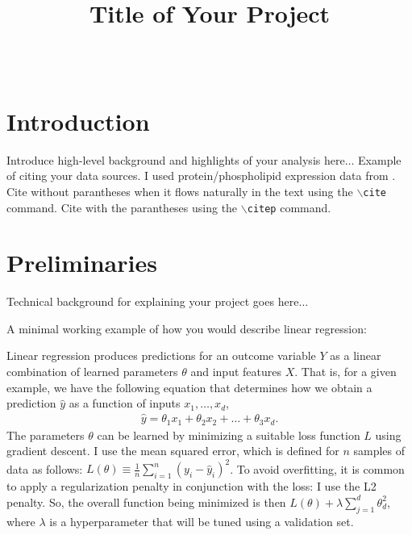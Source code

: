 \documentclass[twoside,11pt]{article}
\begin{document}
\title{Title of Your Project
}

\author{
		 \\
	}


\maketitle

\section{Introduction}
\label{sec:intro}
Introduce high-level background and highlights of your analysis here$\dots$ Example of citing your data sources. I used protein/phospholipid expression data from \cite{sachs2005causal}. Cite without parantheses when it flows naturally in the text using the \texttt{$\backslash$cite} command. Cite with the parantheses using the \texttt{$\backslash$citep} command.


\section{Preliminaries}
\label{sec:prelims}
Technical background for explaining your project goes here$\dots$ 

A minimal working example of how you would describe linear regression:

Linear regression produces predictions for an outcome variable $Y$ as a linear combination of learned parameters $\theta$ and input features $X$. That is, for a given example, we have the following equation that determines how we obtain a prediction $\widehat{y}$ as a function of inputs $x_1, \dots, x_d$,
	\begin{align*}
		\widehat{y} = \theta_1 x_1 + \theta_2 x_2 + \dots + \theta_3 x_d.
	\end{align*}	
	The parameters $\theta$ can be learned by minimizing a suitable loss function $L$ using gradient descent. I  use the mean squared error, which is defined for $n$ samples of data as follows: $L(\theta) \equiv \frac{1}{n} \sum_{i=1}^{n}(y_i - \widehat{y}_i)^2$. To avoid overfitting, it is common to apply a regularization penalty in conjunction with the loss: I use the L2 penalty. So, the overall function being minimized is then $L(\theta) + \lambda \sum_{j=1}^d \theta_d^2$, where $\lambda$ is a hyperparameter that will be tuned using a validation set.
\end{document}
